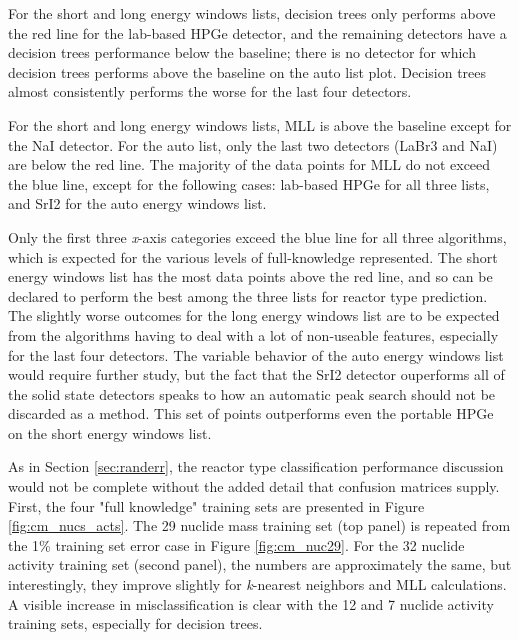 For the short and long energy windows lists, decision trees only performs above
the red line for the lab-based \gls{HPGe} detector, and the remaining detectors
have a decision trees performance below the baseline; there is no detector for
which decision trees performs above the baseline on the auto list plot.
Decision trees almost consistently performs the worse for the last four
detectors.

For the short and long energy windows lists, \gls{MLL} is above the baseline
except for the \gls{NaI} detector.  For the auto list, only the last two
detectors (\gls{LaBr3} and \gls{NaI}) are below the red line.  The majority of
the data points for \gls{MLL} do not exceed the blue line, except for the
following cases: lab-based \gls{HPGe} for all three lists, and \gls{SrI2} for
the auto energy windows list.

Only the first three \textit{x}-axis categories exceed the blue line for all
three algorithms, which is expected for the various levels of full-knowledge
represented. The short energy windows list has the most data points above the
red line, and so can be declared to perform the best among the three lists for
reactor type prediction.  The slightly worse outcomes for the long energy
windows list are to be expected from the algorithms having to deal with a lot
of non-useable features,  especially for the
last four detectors.  The variable behavior of the auto energy windows list
would require further study, but the fact that the \gls{SrI2} detector
ouperforms all of the solid state detectors speaks to how an automatic peak
search should not be discarded as a method. This set of points outperforms even
the portable \gls{HPGe} on the short energy windows list.

As in Section \ref{sec:randerr}, the reactor type classification performance
discussion would not be complete without the added detail that confusion
matrices supply. First, the four "full knowledge" training sets are presented
in Figure \ref{fig:cm_nucs_acts}.  The 29 nuclide mass training set (top panel)
is repeated from the 1\% training set error case in Figure \ref{fig:cm_nuc29}.
For the 32 nuclide activity training set (second panel), the numbers are
approximately the same, but interestingly, they improve slightly for
\textit{k}-nearest neighbors and \gls{MLL} calculations.  A visible increase in
misclassification is clear with the 12 and 7 nuclide activity training sets,
especially for decision trees. 

